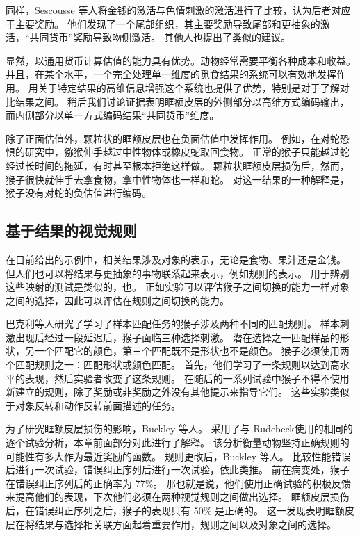 同样，Sescousse 等人\cite{sescousse2010architecture}将金钱的激活与色情刺激的激活进行了比较，认为后者对应于主要奖励。
他们发现了一个尾部组织，其主要奖励导致尾部和更抽象的激活，“共同货币”奖励导致吻侧激活。
其他人也提出了类似的建议\cite{kringelbach2004functional}。\par


显然，以通用货币计算估值的能力具有优势。动物经常需要平衡各种成本和收益。
并且，在某个水平，一个完全处理单一维度的觅食结果的系统可以有效地发挥作用。
用关于特定结果的高维信息增强这个系统也提供了优势，特别是对于了解对比结果之间。
稍后我们讨论证据表明眶额皮层的外侧部分以高维方式编码输出，而内侧部分以单一方式编码结果“共同货币”维度。\par


除了正面估值外，颗粒状的眶额皮层也在负面估值中发挥作用。
例如，在对蛇恐惧的研究中，猕猴伸手越过中性物体或橡皮蛇取回食物。
正常的猴子只能越过蛇经过长时间的拖延，有时甚至根本拒绝这样做。
颗粒状眶额皮层损伤后，然而，猴子很快就伸手去拿食物，拿中性物体也一样和蛇\cite{izquierdo2005comparison}。
对这一结果的一种解释是，猴子没有对蛇的负估值进行编码。
\par



\subsection{基于结果的视觉规则}

在目前给出的示例中，相关结果涉及对象的表示，无论是食物、果汁还是金钱。
但人们也可以将结果与更抽象的事物联系起来表示，例如规则的表示。
用于辨别这些映射的测试是类似的，也。
正如实验可以评估猴子之间切换的能力一样对象之间的选择，因此可以评估在规则之间切换的能力。\par


巴克利等人\cite{buckley2009dissociable}研究了学习了样本匹配任务的猴子涉及两种不同的匹配规则。
样本刺激出现后经过一段延迟后，猴子面临三种选择刺激。
潜在选择之一匹配样品的形状，另一个匹配它的颜色，第三个匹配既不是形状也不是颜色。
猴子必须使用两个匹配规则之一：匹配形状或颜色匹配。
首先，他们学习了一条规则以达到高水平的表现，然后实验者改变了这条规则。
在随后的一系列试验中猴子不得不使用新建立的规则，除了奖励或非奖励之外没有其他提示来指导它们。
这些实验类似于对象反转和动作反转前面描述的任务。\par


为了研究眶额皮层损伤的影响，Buckley 等人。
采用了与 Rudebeck\cite{rudebeck2008frontal}使用的相同的逐个试验分析，本章前面部分对此进行了解释。
该分析衡量动物坚持正确规则的可能性有多大作为最近奖励的函数。
规则更改后，Buckley 等人。
比较性能错误后进行一次试验，错误纠正序列后进行一次试验，依此类推。
前在病变处，猴子在错误纠正序列后的正确率为 77\%。
那也就是说，他们使用正确试验的积极反馈来提高他们的表现，下次他们必须在两种视觉规则之间做出选择。
眶额皮层损伤后，在错误纠正序列之后，猴子的表现只有 50\% 是正确的。
这一发现表明眶额皮层在将结果与选择相关联方面起着重要作用，规则之间以及对象之间的选择。\par



